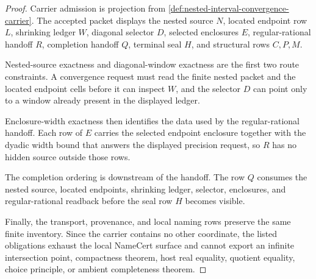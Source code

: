 \begin{proof}
Carrier admission is projection from \autoref{def:nested-interval-convergence-carrier}. The accepted packet displays the nested source $N$, located endpoint row $L$, shrinking ledger $W$, diagonal selector $D$, selected enclosures $E$, regular-rational handoff $R$, completion handoff $Q$, terminal seal $H$, and structural rows $C,P,M$.

Nested-source exactness and diagonal-window exactness are the first two route constraints. A convergence request must read the finite nested packet and the located endpoint cells before it can inspect $W$, and the selector $D$ can point only to a window already present in the displayed ledger.

Enclosure-width exactness then identifies the data used by the regular-rational handoff. Each row of $E$ carries the selected endpoint enclosure together with the dyadic width bound that answers the displayed precision request, so $R$ has no hidden source outside those rows.

The completion ordering is downstream of the handoff. The row $Q$ consumes the nested source, located endpoints, shrinking ledger, selector, enclosures, and regular-rational readback before the seal row $H$ becomes visible.

Finally, the transport, provenance, and local naming rows preserve the same finite inventory. Since the carrier contains no other coordinate, the listed obligations exhaust the local NameCert surface and cannot export an infinite intersection point, compactness theorem, host real equality, quotient equality, choice principle, or ambient completeness theorem.
\end{proof}

